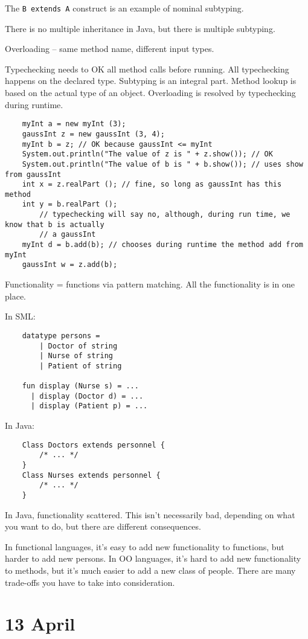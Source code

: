 \documentclass[11pt]{article}
\begin{document}
The \verb~B extends A~ construct is an example of nominal subtyping.

There is no multiple inheritance in Java, but there is multiple subtyping.

Overloading -- same method name, different input types. 

Typechecking needs to OK all method calls before running. All typechecking happens on the declared type. Subtyping is an integral part. Method lookup is based on the actual type of an object. Overloading is resolved by typechecking during runtime. 

\begin{verbatim}
    myInt a = new myInt (3);
    gaussInt z = new gaussInt (3, 4);
    myInt b = z; // OK because gaussInt <= myInt
    System.out.println("The value of z is " + z.show()); // OK
    System.out.println("The value of b is " + b.show()); // uses show from gaussInt
    int x = z.realPart (); // fine, so long as gaussInt has this method
    int y = b.realPart (); 
        // typechecking will say no, although, during run time, we know that b is actually
        // a gaussInt
    myInt d = b.add(b); // chooses during runtime the method add from myInt
    gaussInt w = z.add(b);
\end{verbatim}

Functionality = functions via pattern matching. All the functionality is in one place.

In SML:
\begin{verbatim}
    datatype persons =
        | Doctor of string
        | Nurse of string
        | Patient of string
    
    fun display (Nurse s) = ...
      | display (Doctor d) = ...
      | display (Patient p) = ...
\end{verbatim}

In Java:  
\begin{verbatim}
    Class Doctors extends personnel {
        /* ... */
    }
    Class Nurses extends personnel {
        /* ... */
    }
\end{verbatim}
In Java, functionality scattered. This isn't necessarily bad, depending on what you want to do, but there are different consequences.

In functional languages, it's easy to add new functionality to functions, but harder to add new persons. In OO languages, it's hard to add new functionality to methods, but it's much easier to add a new class of people. There are many trade-offs you have to take into consideration.

\section{13 April}
\end{document}

